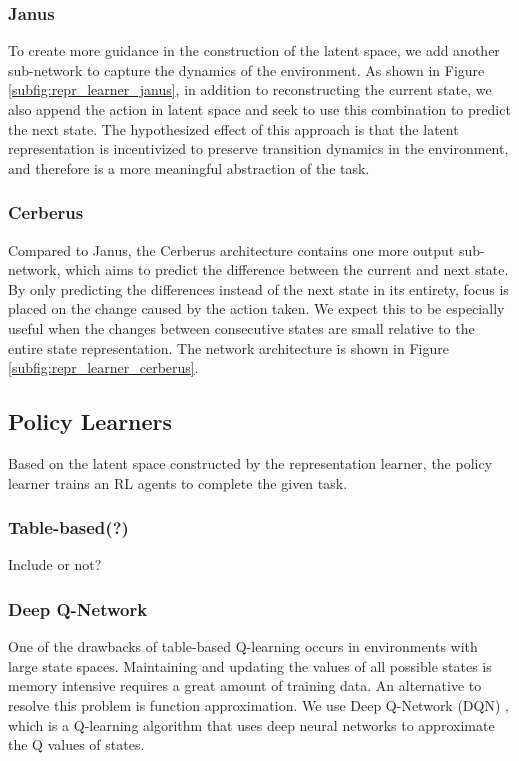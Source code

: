 \subsubsection{Janus}
To create more guidance in the construction of the latent space, we add another sub-network to capture the dynamics of the environment. 
As shown in Figure \ref{subfig:repr_learner_janus},
in addition to reconstructing the current state, we also append the action in latent space and seek to use this combination to predict the next state.
The hypothesized effect of this approach is that the latent representation is incentivized to preserve transition dynamics in the environment, and therefore is a more meaningful abstraction of the task.

\subsubsection{Cerberus}
Compared to Janus, the Cerberus architecture contains one more output sub-network, which aims to predict the difference between the current and next state. 
By only predicting the differences instead of the next state in its entirety, focus is placed on the change caused by the action taken.
We expect this to be especially useful when the changes between consecutive states are small relative to the entire state representation.
The network architecture is shown in Figure \ref{subfig:repr_learner_cerberus}.  

\subsection{Policy Learners}
Based on the latent space constructed by the representation learner, the policy learner trains an RL agents to complete the given task.

\subsubsection{Table-based(?)}
Include or not?

\subsubsection{Deep Q-Network}
One of the drawbacks of table-based Q-learning occurs in environments with large state spaces.
Maintaining and updating the values of all possible states is memory intensive requires a great amount of training data.
An alternative to resolve this problem is function approximation. 
We use Deep Q-Network (DQN) \citep{DQN}, which is a Q-learning algorithm that uses deep neural networks to approximate the Q values of states.

